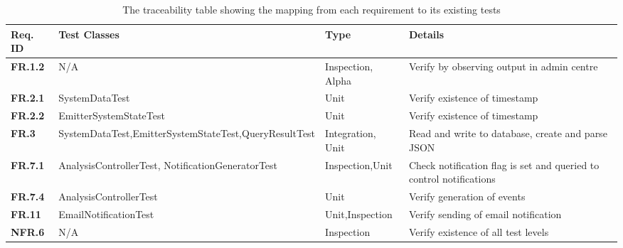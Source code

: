 \documentclass[10pt,a4paper]{article}
\newcommand{\fr}[1]{\textcolor{reqColor}{\textbf{FR.#1}}}
\newcommand{\nfr}[1]{\textcolor{reqColor}{\textbf{NFR.#1}}}
\begin{document}
\begin{table}[H]
\centering
\begin{tabular}{| p{1.5cm} | p{5cm}| p{1.8cm}| p{4.8cm}|}
  \hline\rowcolor{titleColor} \textbf{Req. ID} & \textbf{Test Classes} & \textbf{Type} & \textbf{Details}\\
  \hline \fr{1.2}   & N/A & Inspection, Alpha & Verify by observing output in admin centre\\
  \hline \fr{2.1}   & SystemDataTest & Unit & Verify existence of timestamp\\
  \hline \fr{2.2}   & EmitterSystemStateTest & Unit & Verify existence of timestamp\\
  \hline \fr{3}   & SystemDataTest,\newline EmitterSystemStateTest,\newline QueryResultTest & Integration, Unit & Read and write to database, create and parse JSON\\
  \hline \fr{7.1}   & AnalysisControllerTest, \newline NotificationGeneratorTest & Inspection,\newline Unit & Check notification flag is set and queried to control notifications\\
  \hline \fr{7.4}   & AnalysisControllerTest & Unit & Verify generation of events \\
  \hline \fr{11}    & EmailNotificationTest  & Unit,\newline Inspection & Verify sending of email notification \\
  \hline \nfr{6}    & N/A  & Inspection & Verify existence of all test levels \\
  \hline
  \end{tabular}
  \caption{The traceability table showing the mapping from each requirement to its existing tests}
  \label{tab:traceability}
\end{table}







\vfill


\end{document}
